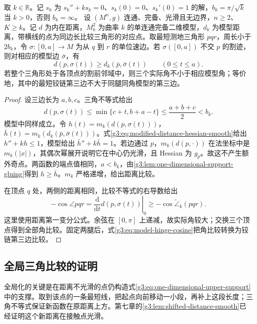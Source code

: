 \begin{proposition}\label{g3:prop:local-toponogov}
	取 \(k\in\mathbb R\)。记 \(s_k\) 为 \(s_k''+ks_k=0\)、\(s_k(0)=0\)、\(s_k'(0)=1\) 的解，\(b_k=\pi/\sqrt k\) 当 \(k>0\)，否则 \(b_k=\infty\)。
 设 \((M^n,g)\) 连通、完备、光滑且无边界，\(n\ge2\)、\(K\ge k\)。记 \(d\) 为内在距离，\(M_k^2\) 为曲率 \(k\) 的单连通完备二维模型，\(d_k\) 为模型距离，带横线的点为同边长比较三角形的对应点。取最短测地三角形 \(pqr\)，周长小于 \(2b_k\)，令 \(\sigma:[0,a]\to M\) 为从 \(q\) 到 \(r\) 的单位速边。若 \(\sigma([0,a])\) 不交 \(p\) 的割迹，则对相应的模型边 \(\bar\sigma\)，有
 \[
 d(p,\sigma(t))\ge d_k(\bar p,\bar\sigma(t))\qquad(0\le t\le a).
 \]
 若整个三角形处于各顶点的割前邻域中，则三个实际角不小于相应模型角；等价地，其中的最短铰链第三边不大于同腿同角模型的第三边。
\end{proposition}
\begin{proof}
 设三边长为 \(a,b,c\)。三角不等式给出
 \begin{equation}\label{g3:eq:triangle-radius-perimeter-bound}
 d(p,\sigma(t))\le\min\{c+t,b+a-t\}\le\frac{a+b+c}{2}<b_k.
 \end{equation}
 模型中同样成立。令 \(h(t)=m_k(d(p,\sigma(t)))\)，\(\bar h(t)=m_k(d_k(\bar p,\bar\sigma(t)))\)。式\eqref{g3:eq:modified-distance-hessian-smooth}给出 \(h''+kh\le1\)，模型给出 \(\bar h''+k\bar h=1\)。若边通过 \(p\)，\(m_k(d(p,\cdot))\) 在法坐标中是 \(m_k(|x|)\)，其偶次幂展开说明它在中心仍光滑，且 Hessian 为 \(g_p\)。故这不产生额外奇点。两函数的端点值相同，\(a<b_k\)，由\cref{g3:lem:one-dimensional-support-gluing}得到 \(h\ge\bar h\)。\(m_k\) 严格递增，给出距离比较。

 在顶点 \(q\) 处，两侧的距离相同，比较不等式的右导数给出
 \[
 -\cos\angle pqr
 =\left.\frac{\mathrm d}{\mathrm dt}d(p,\sigma(t))\right|_{0}
 \ge-\cos\widetilde\angle_k(pqr).
 \]
 这里使用距离第一变分公式。余弦在 \([0,\pi]\) 上递减，故实际角较大；交换三个顶点得到全部角比较。固定两腿后，式\eqref{g3:eq:model-hinge-cosine}把角比较转换为铰链第三边比较。
\end{proof}

\subsection{全局三角比较的证明}
\label{g3:subsec:0903:03}

全局化的关键是在距离不光滑的点仍构造式\eqref{g3:eq:one-dimensional-upper-support}中的支撑。取到该点的一条最短线，把起点向前移动一小段，再补上这段长度；三角不等式保证新函数在原距离上方。第七章的\cref{g3:lem:shifted-distance-smooth}已经证明这个新距离在接触点光滑。

